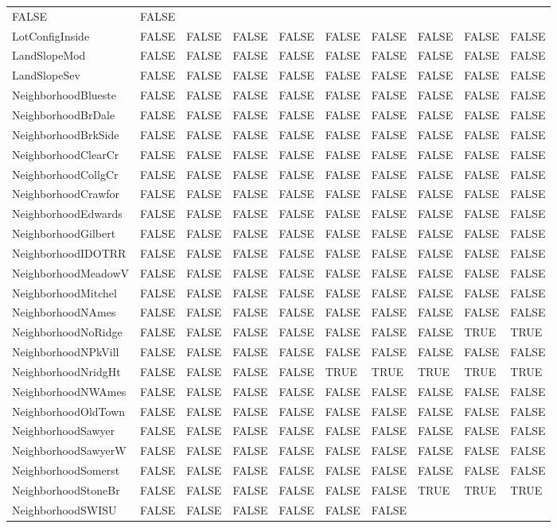 \documentclass[]{article}
\begin{document}
\begin{longtable}[]{@{}llllllllll@{}}
FALSE & FALSE\tabularnewline
LotConfigInside & FALSE & FALSE & FALSE & FALSE & FALSE & FALSE & FALSE
& FALSE & FALSE\tabularnewline
LandSlopeMod & FALSE & FALSE & FALSE & FALSE & FALSE & FALSE & FALSE &
FALSE & FALSE\tabularnewline
LandSlopeSev & FALSE & FALSE & FALSE & FALSE & FALSE & FALSE & FALSE &
FALSE & FALSE\tabularnewline
NeighborhoodBlueste & FALSE & FALSE & FALSE & FALSE & FALSE & FALSE &
FALSE & FALSE & FALSE\tabularnewline
NeighborhoodBrDale & FALSE & FALSE & FALSE & FALSE & FALSE & FALSE &
FALSE & FALSE & FALSE\tabularnewline
NeighborhoodBrkSide & FALSE & FALSE & FALSE & FALSE & FALSE & FALSE &
FALSE & FALSE & FALSE\tabularnewline
NeighborhoodClearCr & FALSE & FALSE & FALSE & FALSE & FALSE & FALSE &
FALSE & FALSE & FALSE\tabularnewline
NeighborhoodCollgCr & FALSE & FALSE & FALSE & FALSE & FALSE & FALSE &
FALSE & FALSE & FALSE\tabularnewline
NeighborhoodCrawfor & FALSE & FALSE & FALSE & FALSE & FALSE & FALSE &
FALSE & FALSE & FALSE\tabularnewline
NeighborhoodEdwards & FALSE & FALSE & FALSE & FALSE & FALSE & FALSE &
FALSE & FALSE & FALSE\tabularnewline
NeighborhoodGilbert & FALSE & FALSE & FALSE & FALSE & FALSE & FALSE &
FALSE & FALSE & FALSE\tabularnewline
NeighborhoodIDOTRR & FALSE & FALSE & FALSE & FALSE & FALSE & FALSE &
FALSE & FALSE & FALSE\tabularnewline
NeighborhoodMeadowV & FALSE & FALSE & FALSE & FALSE & FALSE & FALSE &
FALSE & FALSE & FALSE\tabularnewline
NeighborhoodMitchel & FALSE & FALSE & FALSE & FALSE & FALSE & FALSE &
FALSE & FALSE & FALSE\tabularnewline
NeighborhoodNAmes & FALSE & FALSE & FALSE & FALSE & FALSE & FALSE &
FALSE & FALSE & FALSE\tabularnewline
NeighborhoodNoRidge & FALSE & FALSE & FALSE & FALSE & FALSE & FALSE &
FALSE & TRUE & TRUE\tabularnewline
NeighborhoodNPkVill & FALSE & FALSE & FALSE & FALSE & FALSE & FALSE &
FALSE & FALSE & FALSE\tabularnewline
NeighborhoodNridgHt & FALSE & FALSE & FALSE & FALSE & TRUE & TRUE & TRUE
& TRUE & TRUE\tabularnewline
NeighborhoodNWAmes & FALSE & FALSE & FALSE & FALSE & FALSE & FALSE &
FALSE & FALSE & FALSE\tabularnewline
NeighborhoodOldTown & FALSE & FALSE & FALSE & FALSE & FALSE & FALSE &
FALSE & FALSE & FALSE\tabularnewline
NeighborhoodSawyer & FALSE & FALSE & FALSE & FALSE & FALSE & FALSE &
FALSE & FALSE & FALSE\tabularnewline
NeighborhoodSawyerW & FALSE & FALSE & FALSE & FALSE & FALSE & FALSE &
FALSE & FALSE & FALSE\tabularnewline
NeighborhoodSomerst & FALSE & FALSE & FALSE & FALSE & FALSE & FALSE &
FALSE & FALSE & FALSE\tabularnewline
NeighborhoodStoneBr & FALSE & FALSE & FALSE & FALSE & FALSE & FALSE &
TRUE & TRUE & TRUE\tabularnewline
NeighborhoodSWISU & FALSE & FALSE & FALSE & FALSE & FALSE & FALSE &

\end{longtable}
\end{document}
